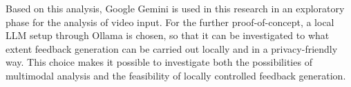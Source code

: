 Based on this analysis, Google Gemini is used in this research in an exploratory phase for the analysis of video input. For the further proof-of-concept, a local LLM setup through Ollama is chosen, so that it can be investigated to what extent feedback generation can be carried out locally and in a privacy-friendly way. This choice makes it possible to investigate both the possibilities of multimodal analysis and the feasibility of locally controlled feedback generation.
%
%
%
%
